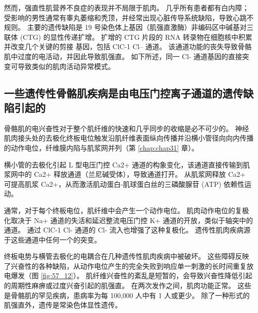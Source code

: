 然而，强直性肌营养不良症的表现并不局限于肌肉。
几乎所有患者都有白内障；
受影响的男性通常有睾丸萎缩和秃顶，并经常出现心脏传导系统缺陷，导致心跳不规则。
主要的遗传缺陷是 19 号染色体上基因（肌强直激酶）非编码区中碱基对三联体 (CTG) 的显性传递扩增。
扩增的 CTG 片段的 RNA 转录物在细胞核中积累并改变几个关键的剪接 基因，包括 ClC-1 Cl– 通道。
该通道功能的丧失导致骨骼肌中过度的电活动，并因此导致肌强直。
如下所述，同一 Cl- 通道基因的直接突变可导致类似的肌肉活动异常模式。



\subsection{一些遗传性骨骼肌疾病是由电压门控离子通道的遗传缺陷引起的}

骨骼肌的电兴奋性对于整个肌纤维的快速和几乎同步的收缩是必不可少的。
神经肌肉接头处的去极化终板电位触发沿肌纤维表面纵向传播并沿横小管径向向内传播的动作电位，纤维膜内陷与肌浆网并列（第 \ref{chap:chap31} 章）。


横小管的去极化引起 L 型电压门控 Ca2+ 通道的构象变化，该通道直接传输到肌浆网中的 Ca2+ 释放通道（兰尼碱受体），导致通道打开。
从肌浆网释放 Ca2+ 可提高肌浆 Ca2+，从而激活肌动蛋白-肌球蛋白丝的三磷酸腺苷 (ATP) 依赖性运动。


通常，对于每个终板电位，肌纤维中会产生一个动作电位。
肌肉动作电位的复极化取决于 Na+ 通道的失活和延迟整流电压门控 K+ 通道的开放，类似于轴突中的通道。
通过 ClC-1 Cl- 通道的 Cl- 流入也增强了这种复极化。
遗传性肌肉疾病源于这些通道中任何一个的突变。


终板电势与横管去极化的电耦合在几种遗传性肌肉疾病中被破坏。
这些障碍反映了兴奋性的各种缺陷，从动作电位产生的完全失败到响应单一刺激的长时间重复放电爆发（图 \ref{fig:57_12}）。
肌纤维兴奋性的紊乱是短暂的，会导致兴奋性降低引起的周期性麻痹或过度兴奋引起的肌强直。
在两次发作之间，肌肉功能正常。 这些是骨骼肌的罕见疾病，患病率为每 100,000 人中有 1 人或更少。
除了一种形式的肌强直外，遗传是常染色体显性遗传。


